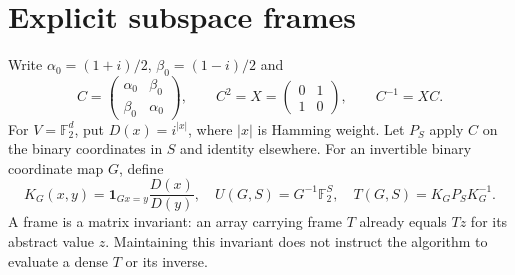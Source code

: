 \documentclass[11pt]{amsart}
\theoremstyle{remark}
\newcommand{\F}{\mathbb F_2}
\begin{document}
\section{Explicit subspace frames}
Write $\alpha_0=(1+i)/2$, $\beta_0=(1-i)/2$ and
\[
 C=\begin{pmatrix}\alpha_0&\beta_0\\\beta_0&\alpha_0\end{pmatrix},
 \qquad C^2=X=\begin{pmatrix}0&1\\1&0\end{pmatrix},\qquad C^{-1}=XC.
\]
For $V=\F^d$, put $D(x)=i^{|x|}$, where $|x|$ is Hamming weight.
Let $P_S$ apply $C$ on the binary coordinates in $S$ and identity
elsewhere. For an invertible binary coordinate map $G$, define
\[
 K_G(x,y)=\mathbf1_{Gx=y}\frac{D(x)}{D(y)},\quad
 U(G,S)=G^{-1}\F^S,\quad T(G,S)=K_GP_SK_G^{-1}.
\]
A frame is a matrix invariant: an array carrying frame $T$ already equals
$Tz$ for its abstract value $z$. Maintaining this invariant does not
instruct the algorithm to evaluate a dense $T$ or its inverse.
\end{document}
